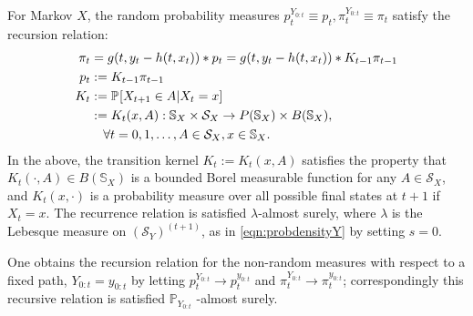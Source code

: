 \begin{lemma}
	For Markov $X$, the random probability measures $p_t^{Y_{0:t}} \equiv p_t, \pi_t^{Y_{0:t}} \equiv \pi_t$ satisfy the recursion relation:
	\begin{align}
	\pi_t &= g(t, y_t - h(t, x_t)) * p_t = g(t, y_t - h(t, x_t)) * K_{t-1} \pi_{t-1} \\
	p_t & :=  K_{t-1} \pi_{t-1} \\
	K_{t} &: = \mathbb{P}_{{}}{[X_{t+1} \in A | X_t = x]} \\
	&:= K_{t}(x, A) : \mathbb{S}_X \times \mathcal{S}_X \to P(\mathbb{S}_X) \times B(\mathbb{S}_X), \\
	& \quad \forall t = 0, 1, \hdots, A \in \mathcal{S}_X, x \in \mathbb{S}_X.
	\end{align} In the above, the transition kernel $K_{t} := K_{t}(x, A)$ satisfies the property that $ K_{t}(\cdot, A) \in B(\mathbb{S}_X)$ is a bounded Borel measurable function for any $A \in \mathcal{S}_X$, and $ K_{t}(x, \cdot)$ is a probability measure over all possible final states at $t+1$ if $X_t = x$. The recurrence relation is satisfied $\lambda$-almost surely, where $\lambda$ is the Lebesque measure on $(\mathcal{S}_Y)^{(t+1)}$, as in \cref{eqn:probdensityY} by setting $s=0$. 
	
	One obtains the recursion relation for the non-random measures with respect to a fixed path, $Y_{0:t}=y_{0:t}$  by letting $p_t^{Y_{0:t}} \to p_t^{y_{0:t}}$ and $\pi_t^{Y_{0:t}} \to \pi_t^{y_{0:t}}$; correspondingly this recursive relation is satisfied $\mathbb{P}_{Y_{0:t}}$ -almost surely.
	

\end{lemma}
